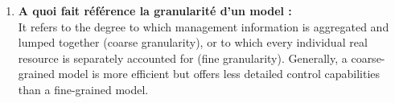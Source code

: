 \documentclass[12pt,landscape]{article}
\begin{document}
\begin{multicols}{2}
\begin{enumerate}
\item \textbf{A quoi fait référence la granularité d'un model :}\\
It refers to the degree to which management information is aggregated and lumped
together (coarse granularity), or to which every individual real resource is separately
accounted for (fine granularity). Generally, a coarse-grained model is more efficient but offers
less detailed control capabilities than a fine-grained model.

\end{enumerate}




\end{multicols}
\end{document}
